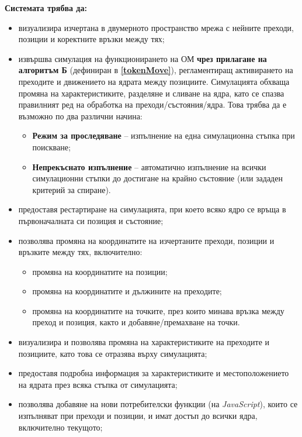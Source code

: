 \textbf{Системата трябва да:}
\begin{itemize}[itemsep=0.5em, topsep=0pt]
	\item визуализира изчертана в двумерното пространство мрежа с нейните преходи, позиции и коректните връзки между тях;
	
    \item извършва симулация на функционирането на ОМ \textbf{чрез прилагане на алгоритъм Б} (дефиниран в \textbf{\ref{tokenMove}}), регламентиращ активирането на преходите и движението на ядрата между позициите. Симулацията обхваща промяна на характеристиките, разделяне и сливане на ядра, като се спазва правилният ред на обработка на преходи/състояния/ядра. Това трябва да е възможно по два различни начина:
    \begin{itemize}
        \item \textbf{Режим за проследяване} -- изпълнение на една симулационна стъпка при поискване;
        \item \textbf{Непрекъснато изпълнение} -- автоматично изпълнение на всички симулационни стъпки до достигане на крайно състояние (или зададен критерий за спиране).
    \end{itemize}

	
	\item предоставя рестартиране на симулацията, при което всяко ядро се връща в първоначалната си позиция и състояние;
	
	\item позволява промяна на координатите на изчертаните преходи, позиции и връзките между тях, включително:
	\begin{itemize}
		\item промяна на координатите на позиции;
		\item промяна на координатите и дължините на преходите;
		\item промяна на координатите на точките, през които минава връзка между преход и позиция, както и добавяне/премахване на точки.
	\end{itemize}
	
	\item визуализира и позволява промяна на характеристиките на преходите и позициите, като това се отразява върху симулацията;
	
	\item предоставя подробна информация за характеристиките и местоположението на ядрата през всяка стъпка от симулацията;
	
	\item позволява добавяне на нови потребителски функции (на \textit{JavaScript}), които се изпълняват при преходи и позиции, и имат достъп до всички ядра, включително текущото;
	

\end{itemize}
